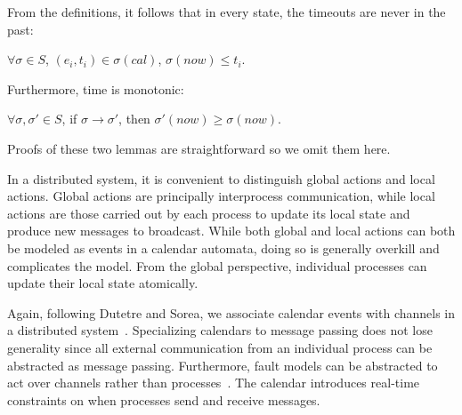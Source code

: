 \documentclass{llncs/llncs}
\begin{document}
From the definitions, it follows that in every state, the timeouts are never in the past:
\begin{lemma}\label{lem:ft}
$\forall \sigma \in S$, $(e_i, t_i) \in \sigma(cal)$, $\sigma(now) \leq t_i$.
\end{lemma}

\noindent
Furthermore, time is monotonic:
\begin{lemma}
$\forall \sigma, \sigma' \in S$, if $\sigma \rightarrow \sigma'$, then $\sigma'(now) \geq \sigma(now)$.
\end{lemma}

Proofs of these two lemmas are straightforward so we omit them here.

In a distributed system, it is convenient to distinguish global actions and local actions. Global actions are principally interprocess communication, while local actions are those carried out by each process to update its local state and produce new messages to broadcast. While both global and local actions can both be modeled as events in a calendar automata, doing so is generally overkill and complicates the model. From the global perspective, individual processes can update their local state atomically.

Again, following Dutetre and Sorea, we associate calendar events with channels in a distributed system~\cite{cal}. Specializing calendars to message passing does not lose generality since all external communication from an individual process can be abstracted as message passing. Furthermore, fault models can be abstracted to act over channels rather than processes~\cite{abstractions}. The calendar introduces real-time constraints on when processes send and receive messages.
\end{document}
